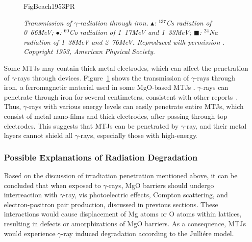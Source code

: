 \documentclass[molecules,review,submit,pdftex,moreauthors]{Definitions/mdpi}
\begin{document}
\begin{figure}
  \begin{center}
    	\begin{overpic}[width=0.85\linewidth]{FigBeach1953PR} 
  	    \end{overpic} 
  \end{center}
  \vspace{-12pt}
  \caption{\textit{Transmission of $\gamma$-radiation through iron. $\blacktriangle$: $^{137}$Cs radiation of \unit{0.66}{MeV}; $\bullet$: $^{60}$Co radiation of \unit{1.17}{MeV} and \unit{1.33}{MeV}; $\blacksquare$: $^{24}$Na radiation of \unit{1.38}{MeV} and \unit{2.76}{MeV}.  Reproduced with permission \cite{Beach1953PR}.  Copyright 1953, American Physical Society.}}
  \label{Fig:Beach1953PR}
\end{figure}


Some MTJs may contain thick metal electrodes, which can affect the penetration of $\gamma$-rays through devices. Figure~\ref{Fig:Beach1953PR} shows the transmission of $\gamma$-rays through iron, a ferromagnetic material used in some MgO-based MTJs \cite{Yuasa2004NM,Zhang2010PRB,Mlynczak2013JAP}.  $\gamma$-rays can penetrate through iron for several centimeters, consistent with other reports \cite{Tsypin1956SJAE}.  Thus, $\gamma$-rays with various energy levels can easily penetrate entire MTJs, which consist of metal nano-films and thick electrodes, after passing through top electrodes.  This suggests that MTJs can be penetrated by $\gamma$-ray, and their metal layers cannot shield all $\gamma$-rays, especially those with high-energy.  


\subsubsection{Possible Explanations of Radiation Degradation}


Based on the discussion of irradiation penetration mentioned above, it can be concluded that when exposed to $\gamma$-rays, MgO barriers should undergo interreaction with $\gamma$-ray, vis photoelectric effects, Compton scattering, and electron-positron pair production, discussed in previous sections.  These interactions would cause displacement of Mg atoms or O atoms within lattices, resulting in defects or amorphizations of MgO barriers.  As a consequence, MTJs would experience $\gamma$-ray induced degradation according to the Julli\'{e}re model.
\end{document}
